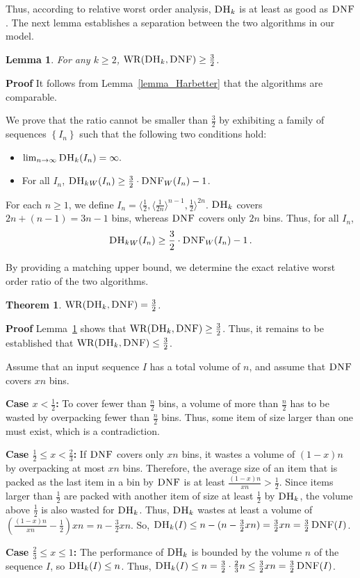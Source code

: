 \documentclass[11pt]{article}
\newtheorem{xtheorem}{Theorem}
\newtheorem{xlemma}{Lemma}
\newenvironment{theorem}{\begin{xtheorem}\rm}{\end{xtheorem}}
\newenvironment{lemma}{\begin{xlemma}\rm}{\end{xlemma}}
\newenvironment{proof}{\begin{trivlist}\item[]{\bf Proof }}{\hspace*{\fill}\raisebox{-1pt}{\boldmath$\Box$}\end{trivlist}}
\newcommand{\DNF}{\ensuremath{\operatorname{\textsc{DNF}}}\xspace}
\newcommand{\DHk}{{\ensuremath{\textsc{DH}_k}}\xspace}
\newcommand{\SET}[1]{\left\{#1\right\}}
\newcommand{\SEQ}[1]{\langle #1 \rangle}
\newcommand{\WR}{\ensuremath{\mathrm{WR}}\xspace}
\newcommand{\RWOR}[2]{\ensuremath{\WR(#1,#2)}\xspace}
\begin{document}
Thus, according to relative worst order analysis, \DHk is at least as
good as \DNF.
The next lemma establishes
 a separation between the two algorithms in our model.
\begin{lemma}\label{lemma_32Harmonic}
For any $k\geq 2$, $\RWOR{\DHk}{\DNF} \geq \frac32$.
\end{lemma}
\begin{proof}
It follows from Lemma~\ref{lemma_Harbetter} that the algorithms are
comparable.

We prove that the ratio cannot be smaller than $\frac{3}{2}$ by
exhibiting a family of sequences $\SET{I_n}$ such that the following two conditions hold:
\begin{itemize}
\item
$\lim_{n\rightarrow\infty}\DHk(I_n)=\infty.$
\item
For all $I_n$, $\DHk{}_W(I_n)\geq\frac{3}{2}\cdot \DNF_W(I_n) - 1$.
\end{itemize}

For each $n \geq 1$, we define $I_n =
 \SEQ{\frac{1}{2},\SEQ{\frac{1}{2n}}^{n-1},\frac{1}{2}}^{2n}$.
\DHk covers $2n + (n-1) = 3n-1$ bins, whereas \DNF covers only $2n$
 bins.
Thus, for all $I_n$,
$${\DHk}_W(I_n)\geq\frac{3}{2}\cdot {\DNF}_W(I_n)-1\,.$$
\end{proof}

By providing a matching upper bound, we determine the exact
relative worst order ratio of the two algorithms.
\begin{theorem}
\label{theorem-RWOR}
$\RWOR{\DHk}{\DNF} = \frac{3}{2}$.
\end{theorem}
\begin{proof}
Lemma~\ref{lemma_32Harmonic} shows that
$\RWOR{\DHk}{\DNF} \geq \frac{3}{2}$.
Thus, it remains to be established that 
$\RWOR{\DHk}{\DNF} \leq \frac{3}{2}$.

Assume that an input sequence $I$ has a total volume of $n$,
and assume that \DNF covers $xn$ bins.

\textbf{Case $x < \frac{1}{2}$:} To cover fewer than $\frac{n}{2}$ bins, a
volume of more than $\frac{n}{2}$ has to be wasted by overpacking fewer than
$\frac{n}{2}$ bins. Thus, some item of size larger than one must exist,
which is a contradiction.

\textbf{Case $\frac{1}{2}\leq x <\frac{2}{3}$:} If \DNF covers only $xn$
bins, it wastes a volume of $(1-x)n$ by overpacking at most $xn$ bins.
Therefore, the average size of an item that is packed as the last
item in a bin by \DNF
is at least $\frac{(1-x)n}{xn} > \frac{1}{2}$.
Since items larger than $\frac{1}{2}$ are packed with another item
of size at least $\frac{1}{2}$ by \DHk,
the volume above $\frac{1}{2}$ is also wasted for \DHk.
Thus, \DHk wastes at least a volume of
$(\frac{(1-x)n}{xn}-\frac{1}{2})xn = n - \frac{3}{2}xn$.
So,
$\DHk(I) \leq n - (n - \frac{3}{2}xn) = \frac{3}{2} xn = \frac{3}{2} \DNF(I)$.

\textbf{Case $\frac{2}{3}\leq x \leq 1$:} The performance of \DHk is
bounded by the volume $n$ of the sequence $I$, so $\DHk(I) \leq n$.
Thus, $\DHk(I) \leq n = \frac{3}{2} \cdot \frac{2}{3}n \leq \frac{3}{2}
xn = \frac{3}{2} \DNF(I)$.
\end{proof}
\end{document}

